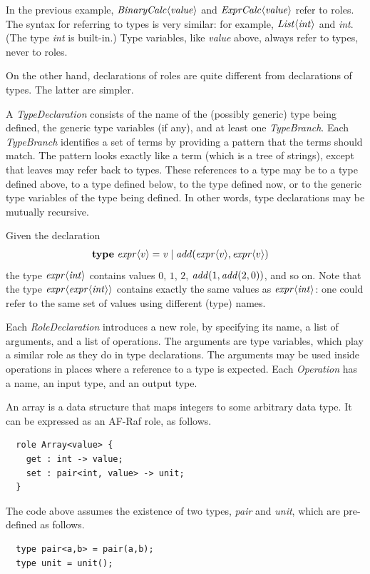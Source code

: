 \documentclass[a4paper,12pt,oneside,fleqn]{book} %
\begin{document}
\begin{example}
In the previous example, $\it BinaryCalc\langle value\rangle$ and $\it
ExprCalc\langle value\rangle$ refer to roles.  The syntax for referring to
types is very similar: for example, $\it List\langle int\rangle$ and {\it
int}. (The type {\it int\/} is built-in.) Type variables, like {\it value}
above, always refer to types, never to roles.
\end{example}

On the other hand, declarations of roles are quite different from
declarations of types. The latter are simpler.

A {\it TypeDeclaration\/} consists of the name of the (possibly generic)
type being defined, the generic type variables (if any), and at least one
{\it TypeBranch}. Each {\it TypeBranch\/} identifies a set of terms by
providing a pattern that the terms should match. The pattern looks exactly
like a term (which is a tree of strings), except that leaves may refer back
to types. These references to a type may be to a type defined above, to a
type defined below, to the type defined now, or to the generic type
variables of the type being defined. In other words, type declarations may
be mutually recursive.

\begin{example}
Given the declaration
\begin{align}
&{\bf type}\ {\it expr}\langle v\rangle
  = {\it v}
  \mid {\it add}({\it expr}\langle v\rangle, {\it expr}\langle v\rangle)
\end{align}
the type ${\it expr}\langle{\it int}\rangle$ contains values $0$, $1$, $2$,
${\it add}(1,{\it add}(2,0))$, and so on. Note that the type ${\it
expr}\langle{\it expr}\langle{\it int}\rangle\rangle$ contains exactly the
same values as ${\it expr}\langle{\it int}\rangle$: one could refer to the
same set of values using different (type) names.
\end{example}

Each {\it RoleDeclaration\/} introduces a new role, by specifying its name,
a list of arguments, and a list of operations. The arguments are type
variables, which play a similar role as they do in type declarations. The
arguments may be used inside operations in places where a reference to a
type is expected. Each {\it Operation\/} has a name, an input type, and an
output type.

\begin{example}
An array is a data structure that maps integers to some arbitrary data
type. It can be expressed as an AF-Raf role, as follows.
\begin{verbatim}
  role Array<value> {
    get : int -> value;
    set : pair<int, value> -> unit;
  }
\end{verbatim}
The code above assumes the existence of two types, {\it pair\/} and {\it
unit}, which are pre-defined as follows.
\begin{verbatim}
  type pair<a,b> = pair(a,b);
  type unit = unit();
\end{verbatim}
\end{example}
\end{document}
